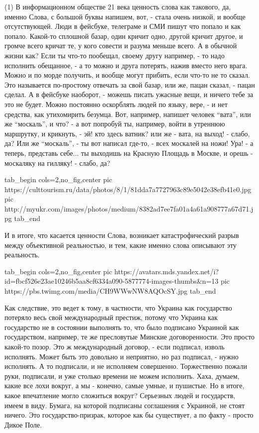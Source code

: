 (1) В информационном обществе 21 века ценность слова как такового, да, именно
Слова, с большой буквы напишем, вот, - стала очень низкой, и вообще
отсутствующей. Люди в фейсбуке, телеграме и СМИ пишут что попало и как попало.
Какой-то сплошной базар, один кричит одно, другой кричит другое, и громче всего
кричат те, у кого совести и разума меньше всего.  А в обычной жизни как? Если
ты что-то пообещал, своему другу например, - то надо исполнить обещанное, - а
то можно и друга потерять, нажив вместо него врага. Можно и по морде получить,
и вообще могут прибить, если что-то не то сказал. Это называется по-простому
отвечать за свой базар, или же, пацан сказал, - пацан сделал. А в фейсбуке
наоборот, - можешь писать ужасные вещи, и ничего тебе за это не будет. Можно
постоянно оскорблять людей по языку, вере, - и нет средства, как утихомирить
безумца. Вот, например, напишет человек \enquote{вата}, или же
\enquote{москаль}, и что? - а вот попробуй ты, например, войти в утреннюю
маршрутку, и крикнуть, - эй! кто здесь ватник?  или же - вата, на выход! -
слабо, да? Или же \enquote{москаль}, - ты вот написал где-то, - всех москалей
на ножи! Ура! - а теперь, представь себе... ты выходишь на Красную Площадь в
Москве, и орешь - москаляку на гилляку! - слабо, да?

\ifcmt
  tab_begin cols=2,no_fig,center
     pic https://culttourism.ru/data/photos/8/1/81dda7a7727963c89e5042e38efb41e0.jpg
     pic http://myukr.com/images/photos/medium/8382ad7ee7fa01a4a61a908777a67d71.jpg 
  tab_end
\fi

И в итоге, что касается ценности Слова, возникает катастрофический разрыв между
объективной реальностью, и тем, какие именно слова описывают эту реальность.

\ifcmt
  tab_begin cols=2,no_fig,center
     pic https://avatars.mds.yandex.net/i?id=fbcf526e23ae10246b5aa8cf6334a090-5877774-images-thumbs&n=13
     pic https://pbs.twimg.com/media/CH9WWwNW8AQOcSY.jpg
  tab_end
\fi

Как следствие, это ведет к тому, в частности, что Украина как государство
потеряло весь свой международный престиж, потому что Украина как государство не
в состоянии выполнять то, что было подписано Украиной как государством,
например, те же пресловутые Минские договоренности. Это просто какой-то позор.
Это ж международный договор, - если подписал, изволь исполнять.  Может быть это
довольно и неприятно, но раз подписал, - нужно исполнять. А то подписали, и не
исполняем совершенно. Торжественно пожали руки, подписали, и уже столько
времени не можем исполнить. Хаха, думаем, какие все лохи вокруг, а мы -
конечно, самые умные, и пушистые. Но в итоге, какое впечатление могло сложиться
вокруг? Серьезных людей и государств, имеем в виду. Бумага, на которой
подписаны соглашения с Украиной, не стоят ничего. Это государство-призрак,
которое как бы существует, а по факту - просто Дикое Поле.

